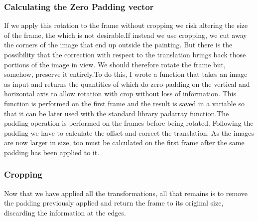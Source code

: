 \documentclass[a4paper]{article}
\begin{document}
	\subsubsection{Calculating the Zero Padding vector}
	If we apply this rotation to the frame without cropping we risk altering the size of the frame, the which is not desirable.If instead we use cropping, we cut away the corners of the image that end up outside the painting. But there is the possibility that the correction with respect to the translation brings back those portions of the image in view. We should therefore rotate the frame but, somehow, preserve it entirely.To do this, I wrote a function that takes an image as input and returns the quantities of which do zero-padding on the vertical and horizontal axis to allow rotation with crop without loss of	information.
	This function is performed on the first frame and the result is saved in a variable so that it can be later used with the standard library padarray function.The padding operation is performed on the frames before being rotated. Following the padding we have to calculate the offset and correct the translation. As the images are now larger in size, too must be calculated on the first frame after the same padding has been applied to it.
	\subsubsection{Cropping}
	Now that we have applied all the transformations, all that remains is to remove the padding previously applied and return the frame to its original size, discarding the information at the edges.
	
\end{document}
